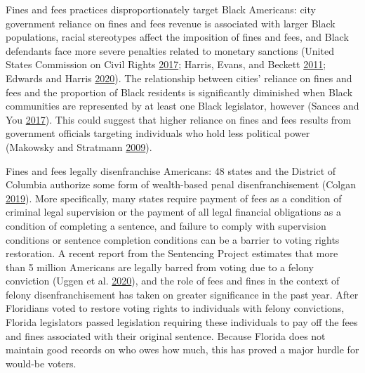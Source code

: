 \documentclass[
  12pt,
]{article}
\begin{document}
Fines and fees practices disproportionately target Black Americans: city government reliance on fines and fees revenue is associated with larger Black populations, racial stereotypes affect the imposition of fines and fees, and Black defendants face more severe penalties related to monetary sanctions (United States Commission on Civil Rights \protect\hyperlink{ref-UnitedStatesCommissiononCivilRights2017}{2017}; Harris, Evans, and Beckett \protect\hyperlink{ref-Harris2011}{2011}; Edwards and Harris \protect\hyperlink{ref-Edwards2020}{2020}). The relationship between cities' reliance on fines and fees and the proportion of Black residents is significantly diminished when Black communities are represented by at least one Black legislator, however (Sances and You \protect\hyperlink{ref-Sances2017}{2017}). This could suggest that higher reliance on fines and fees results from government officials targeting individuals who hold less political power (Makowsky and Stratmann \protect\hyperlink{ref-Makowsky2009}{2009}).

Fines and fees legally disenfranchise Americans: 48 states and the District of Columbia authorize some form of wealth-based penal disenfranchisement (Colgan \protect\hyperlink{ref-Colgan2019}{2019}). More specifically, many states require payment of fees as a condition of criminal legal supervision or the payment of all legal financial obligations as a condition of completing a sentence, and failure to comply with supervision conditions or sentence completion conditions can be a barrier to voting rights restoration. A recent report from the Sentencing Project estimates that more than 5 million Americans are legally barred from voting due to a felony conviction (Uggen et al. \protect\hyperlink{ref-Uggen2020}{2020}), and the role of fees and fines in the context of felony disenfranchisement has taken on greater significance in the past year. After Floridians voted to restore voting rights to individuals with felony convictions, Florida legislators passed legislation requiring these individuals to pay off the fees and fines associated with their original sentence. Because Florida does not maintain good records on who owes how much, this has proved a major hurdle for would-be voters.
\end{document}

